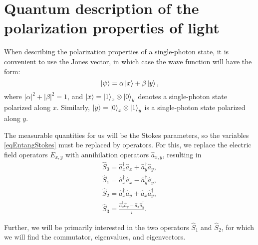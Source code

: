 \section{Quantum description of the polarization properties of light}
When describing the polarization properties of a single-photon state, it is convenient
to use the Jones vector, in which case the wave function will have the form:
\begin{equation}
\left|\psi\right> = 
\alpha \ket{x} + 
\beta \ket{y},
\label{eqEntangSimpleState}
\end{equation}
where $\left|\alpha\right|^2 + \left|\beta\right|^2 = 1$, and
$\ket{x} = \ket{1}_x\otimes\ket{0}_y$ denotes
a single-photon state polarized along $x$. Similarly,
$\ket{y} = \ket{0}_x\otimes\ket{1}_y$ is a
single-photon state polarized along $y$. 

The measurable quantities for us will be the Stokes parameters, so the variables
\eqref{eqEntangStokes} must be replaced by operators. For this, we
replace the electric field operators $E_{x,y}$ with annihilation operators $\hat{a}_{x,y}$, resulting in
\begin{eqnarray}
\hat{S}_0 = \hat{a}_x^{\dag} \hat{a}_x + \hat{a}_y^{\dag} \hat{a}_y,
\nonumber \\
\hat{S}_1 = \hat{a}_x^{\dag} \hat{a}_x - \hat{a}_y^{\dag} \hat{a}_y,
\nonumber \\
\hat{S}_2 = \hat{a}_x^{\dag} \hat{a}_y + \hat{a}_x \hat{a}_y^{\dag},
\nonumber \\
\hat{S}_3 = \frac{\hat{a}_x^{\dag} \hat{a}_y - \hat{a}_x \hat{a}_y^{\dag}}{i}.
\label{eqEntangStokesOper}
\end{eqnarray}

Further, we will be primarily interested in the two operators
$\hat{S}_1$ and $\hat{S}_2$, for which we will find the commutator,
eigenvalues, and eigenvectors.

